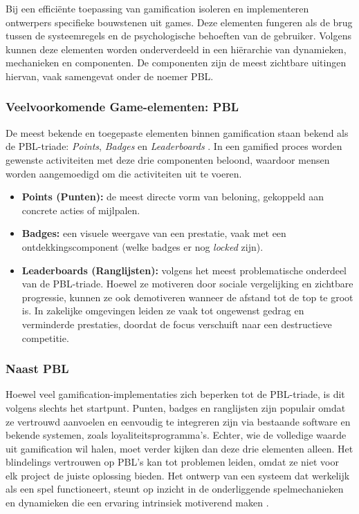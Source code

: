 Bij een efficiënte toepassing van gamification isoleren en implementeren ontwerpers specifieke bouwstenen uit games. 
Deze elementen fungeren als de brug tussen de systeemregels en de psychologische behoeften van de gebruiker. 
Volgens \textcite{KevinWerbach2020} kunnen deze elementen worden onderverdeeld in een hiërarchie van dynamieken, mechanieken en componenten. 
De componenten zijn de meest zichtbare uitingen hiervan, vaak samengevat onder de noemer PBL.

\subsubsection{Veelvoorkomende Game-elementen: PBL}

De meest bekende en toegepaste elementen binnen gamification staan bekend als de PBL-triade: \textit{Points}, \textit{Badges} en \textit{Leaderboards} \autocite{KevinWerbach2020}. In een gamified proces worden gewenste activiteiten met deze drie componenten beloond, waardoor mensen worden aangemoedigd om die activiteiten uit te voeren.

\begin{itemize}
    \item \textbf{Points (Punten):} de meest directe vorm van beloning, gekoppeld aan concrete acties of mijlpalen.
    \item \textbf{Badges:} een visuele weergave van een prestatie, vaak met een ontdekkingscomponent (welke badges er nog \textit{locked} zijn).
    \item \textbf{Leaderboards (Ranglijsten):} volgens \textcite{KevinWerbach2020} het meest problematische onderdeel van de PBL-triade. Hoewel ze motiveren door sociale vergelijking en zichtbare progressie, kunnen ze ook demotiveren wanneer de afstand tot de top te groot is. In zakelijke omgevingen leiden ze vaak tot ongewenst gedrag en verminderde prestaties, doordat de focus verschuift naar een destructieve competitie.
\end{itemize}

\subsubsection{Naast PBL}
Hoewel veel gamification-implementaties zich beperken tot de PBL-triade, is dit volgens \textcite{KevinWerbach2020} slechts het startpunt. 
Punten, badges en ranglijsten zijn populair omdat ze vertrouwd aanvoelen en eenvoudig te integreren zijn via bestaande software en bekende systemen, zoals loyaliteitsprogramma's.
Echter, wie de volledige waarde uit gamification wil halen, moet verder kijken dan deze drie elementen alleen.
Het blindelings vertrouwen op PBL's kan tot problemen leiden, omdat ze niet voor elk project de juiste oplossing bieden.
Het ontwerp van een systeem dat werkelijk als een spel functioneert, steunt op inzicht in de onderliggende spelmechanieken en dynamieken die een ervaring intrinsiek motiverend maken \autocite{KevinWerbach2020}.

